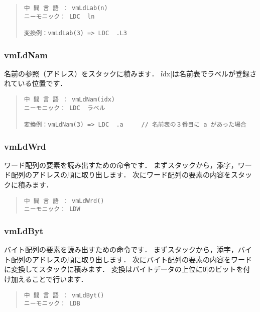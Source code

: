 \begin{quote}
\begin{verbatim}
中 間 言 語 ： vmLdLab(n)
ニーモニック： LDC  ln   

変換例：vmLdLab(3) => LDC  .L3
\end{verbatim}
\end{quote}

\subsubsection{vmLdNam}

名前の参照（アドレス）をスタックに積みます．
\|idx|は名前表でラベルが登録されている位置です．

\begin{quote}
\begin{verbatim}
中 間 言 語 ： vmLdNam(idx)
ニーモニック： LDC  ラベル

変換例：vmLdNam(3) => LDC  .a     // 名前表の３番目に a があった場合
\end{verbatim}
\end{quote}

\subsubsection{vmLdWrd}

ワード配列の要素を読み出すための命令です．
まずスタックから，添字，ワード配列のアドレスの順に取り出します．
次にワード配列の要素の内容をスタックに積みます．

\begin{quote}
\begin{verbatim}
中 間 言 語 ： vmLdWrd()
ニーモニック： LDW
\end{verbatim}
\end{quote}

\subsubsection{vmLdByt}

バイト配列の要素を読み出すための命令です．
まずスタックから，添字，バイト配列のアドレスの順に取り出します．
次にバイト配列の要素の内容をワードに変換してスタックに積みます．
変換はバイトデータの上位に\|0|のビットを付け加えることで行います．

\begin{quote}
\begin{verbatim}
中 間 言 語 ： vmLdByt()
ニーモニック： LDB
\end{verbatim}
\end{quote}

